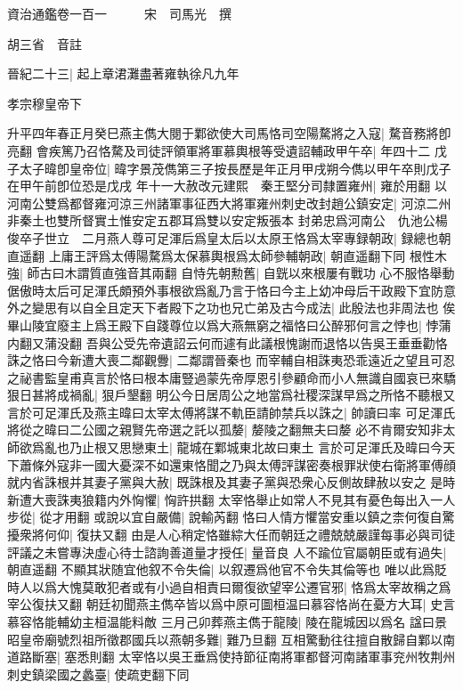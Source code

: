 資治通鑑卷一百一　　　宋　司馬光　撰

胡三省　音註

晉紀二十三|{
	起上章涒灘盡著雍執徐凡九年}


孝宗穆皇帝下

升平四年春正月癸巳燕主儁大閱于鄴欲使大司馬恪司空陽騖將之入寇|{
	騖音務將卽亮翻}
會疾篤乃召恪騖及司徒評領軍將軍慕輿根等受遺詔輔政甲午卒|{
	年四十二}
戊子太子暐卽皇帝位|{
	暐字景茂儁第三子按長歷是年正月甲戌朔今儁以甲午卒則戊子在甲午前卽位恐是戊戌}
年十一大赦改元建熙　秦王堅分司隸置雍州|{
	雍於用翻}
以河南公雙爲都督雍河涼三州諸軍事征西大將軍雍州刺史改封趙公鎮安定|{
	河涼二州非秦土也雙所督實土惟安定五郡耳爲雙以安定叛張本}
封弟忠爲河南公　仇池公楊俊卒子世立　二月燕人尊可足渾后爲皇太后以太原王恪爲太宰專録朝政|{
	録總也朝直遥翻}
上庸王評爲太傅陽騖爲太保慕輿根爲太師參輔朝政|{
	朝直遥翻下同}
根性木強|{
	師古曰木謂質直強音其兩翻}
自恃先朝勲舊|{
	自皝以來根屢有戰功}
心不服恪舉動倨傲時太后可足渾氏頗預外事根欲爲亂乃言于恪曰今主上幼冲母后干政殿下宜防意外之變思有以自全且定天下者殿下之功也兄亡弟及古今成法|{
	此殷法也非周法也}
俟畢山陵宜廢主上爲王殿下自踐尊位以爲大燕無窮之福恪曰公醉邪何言之悖也|{
	悖蒲内翻又蒲没翻}
吾與公受先帝遺詔云何而遽有此議根愧謝而退恪以告吳王垂垂勸恪誅之恪曰今新遭大喪二鄰觀釁|{
	二鄰謂晉秦也}
而宰輔自相誅夷恐乖遠近之望且可忍之祕書監皇甫真言於恪曰根本庸豎過蒙先帝厚恩引參顧命而小人無識自國哀已來驕狠日甚將成禍亂|{
	狠戶墾翻}
明公今日居周公之地當爲社稷深謀早爲之所恪不聽根又言於可足渾氏及燕主暐曰太宰太傅將謀不軌臣請帥禁兵以誅之|{
	帥讀曰率}
可足渾氏將從之暐曰二公國之親賢先帝選之託以孤嫠|{
	嫠陵之翻無夫曰嫠}
必不肯爾安知非太師欲爲亂也乃止根又思戀東土|{
	龍城在鄴城東北故曰東土}
言於可足渾氏及暐曰今天下蕭條外寇非一國大憂深不如還東恪聞之乃與太傅評謀密奏根罪狀使右衛將軍傅顔就内省誅根并其妻子黨與大赦|{
	既誅根及其妻子黨與恐衆心反側故肆赦以安之}
是時新遭大喪誅夷狼籍内外恟懼|{
	恟許拱翻}
太宰恪舉止如常人不見其有憂色每出入一人步從|{
	從才用翻}
或說以宜自嚴備|{
	說輸芮翻}
恪曰人情方懼當安重以鎮之柰何復自驚擾衆將何仰|{
	復扶又翻}
由是人心稍定恪雖綜大任而朝廷之禮兢兢嚴謹每事必與司徒評議之未嘗專決虛心待士諮詢善道量才授任|{
	量音良}
人不踰位官屬朝臣或有過失|{
	朝直遥翻}
不顯其狀随宜他叙不令失倫|{
	以叙遷爲他官不令失其倫等也}
唯以此爲貶時人以爲大愧莫敢犯者或有小過自相責曰爾復欲望宰公遷官邪|{
	恪爲太宰故稱之爲宰公復扶又翻}
朝廷初聞燕主儁卒皆以爲中原可圖桓温曰慕容恪尚在憂方大耳|{
	史言慕容恪能輔幼主桓温能料敵}
三月己卯葬燕主儁于龍陵|{
	陵在龍城因以爲名}
諡曰景昭皇帝廟號烈祖所徵郡國兵以燕朝多難|{
	難乃旦翻}
互相驚動往往擅自散歸自鄴以南道路斷塞|{
	塞悉則翻}
太宰恪以吳王垂爲使持節征南將軍都督河南諸軍事兖州牧荆州刺史鎮梁國之蠡臺|{
	使疏吏翻下同}
